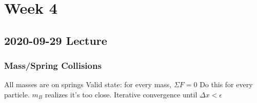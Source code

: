 \chapter{Week 4}

\section{2020-09-29 Lecture}

\subsection{Mass/Spring Collisions}

\begin{outline}
    \1 All masses are on springs
    \1 Valid state: for every mass, $\Sigma F = 0$
    \1 Do this for every particle. $m_B$ realizes it's too close.
    \1 Iterative convergence until $\Delta x < \epsilon$
\end{outline}
